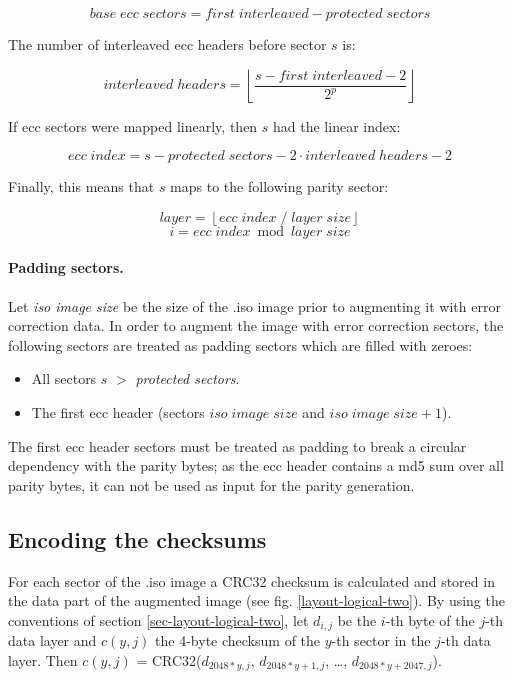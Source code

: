 \[ base\; ecc\; sectors = first\; interleaved - protected\; sectors\]

The number of interleaved ecc headers before sector $s$ is:

\[ interleaved\; headers = \left\lfloor\frac{s - first\; interleaved - 2}{2^p}\right\rfloor \]

If ecc sectors were mapped linearly, then $s$ had the linear index:

\[ ecc\; index = s - protected\; sectors - 2 \cdot interleaved\; headers - 2\]

Finally, this means that $s$ maps to the following parity sector:

\[ layer = \left\lfloor ecc\; index\; /\; layer\; size\right\rfloor \]
\[ i = ecc\;index \bmod layer\; size \]

\paragraph{Padding sectors.} Let {\em iso image size} be the size of the
.iso image prior to augmenting it with error correction data. In order
to augment the image with error correction sectors, the following
sectors are treated as padding sectors which are filled with zeroes:

\begin{itemize}
\item All sectors $s$ $>$ {\em protected sectors}.
\item The first ecc header (sectors $iso\; image\; size$ and $iso\; image\; size+1$).
\end{itemize}
 
The first ecc header sectors must be treated as padding to break a circular
dependency with the parity bytes; as the ecc header contains a md5 sum over
all parity bytes, it can not be used as input for the parity generation.

\subsection{Encoding the checksums}
\label{crc-two}

For each sector of the .iso image a CRC32 checksum is calculated and stored in the
data part of the augmented image (see fig. \ref{layout-logical-two}). By using the
conventions of section \ref{sec-layout-logical-two}, let $d_{i,j}$ be the $i$-th byte
of the $j$-th data layer and $c(y,j)$ the 4-byte checksum of the $y$-th sector
in the $j$-th data layer. Then $c(y,j)$ = CRC32($d_{2048*y,j}$, $d_{2048*y+1,j}$, \dots, $d_{2048*y+2047,j}$).  

